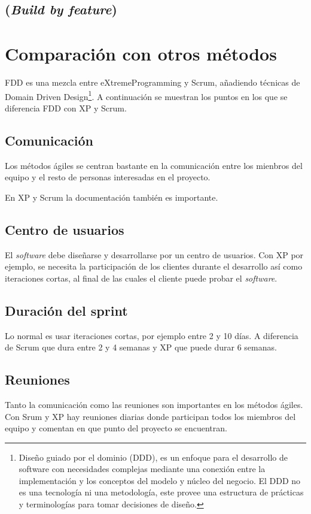 \documentclass[11pt]{article}
\begin{document}
\subsection{(\textit{Build by feature})}



\section{Comparación con otros métodos}
FDD es una mezcla entre eXtremeProgramming y Scrum, añadiendo técnicas de Domain Driven Design\footnote{Diseño guiado por el dominio (DDD), es un enfoque para el desarrollo de software con necesidades complejas mediante una conexión entre la implementación y los conceptos del modelo y núcleo del negocio. El DDD no es una tecnología ni una metodología, este provee una estructura de prácticas y terminologías para tomar decisiones de diseño.}. A continuación se muestran los puntos en los que se diferencia FDD con XP y Scrum.


\subsection*{Comunicación}
Los métodos ágiles se centran bastante en la comunicación entre los mienbros del equipo y el resto de personas interesadas en el proyecto.

En XP y Scrum la documentación también es importante.

\subsection*{Centro de usuarios}

El \textit{software} debe diseñarse y desarrollarse por un centro de usuarios. Con XP por ejemplo, se necesita la participación de los clientes durante el desarrollo así como iteraciones cortas, al final de las cuales el cliente puede probar el \textit{software}.

\subsection*{Duración del sprint}
Lo normal es usar iteraciones cortas, por ejemplo entre 2 y 10 días. A diferencia de Scrum que dura entre 2 y 4 semanas y XP que puede durar 6 semanas.

\subsection*{Reuniones}
Tanto la comunicación como las reuniones son importantes en los métodos ágiles. Con Srum y XP hay reuniones diarias donde participan todos los miembros del equipo y comentan en que punto del proyecto se encuentran. 
\end{document}
